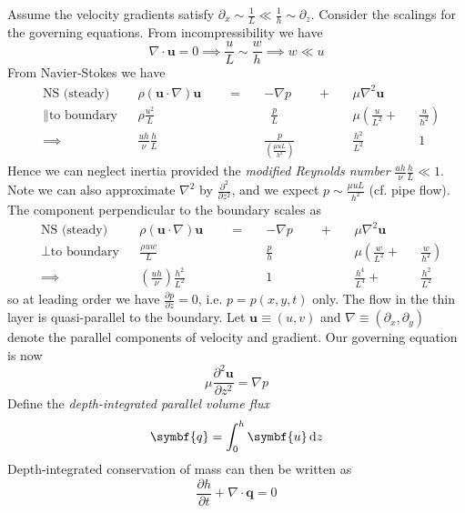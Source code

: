 \documentclass{jknotes}
\begin{document}
Assume the velocity gradients satisfy $\partial_x \sim \frac{1}{L} \ll
\frac{1}{h} \sim \partial_z$. Consider the scalings for the governing
equations. From incompressibility we have
\begin{equation}
	\nabla \cdot \symbf{u} = 0 \implies \frac{u}{L} \sim \frac{w}{h} \implies
	w \ll u
\end{equation}
From Navier-Stokes we have
\begin{align}
	&\text{NS (steady)} && \rho (\symbf{u}\cdot\nabla)\symbf{u}\hspace{2em} =
	&&-\nabla p
	\hspace{2em}+ &&\mu \nabla^2 \symbf{u} &&\\
	  &\parallel \text{to boundary} &&\rho \frac{u^2}{L} &&\,\,\, \frac{p}{L} && \mu
	\left(\frac{u}{L^2}\right. + &&\left.\frac{u}{h^2}\right)\\
	&\implies &&\frac{u h}{\nu} \frac{h}{L} && \frac{p}{\left(\frac{\mu uL}{h^2}\right)}
	&&\frac{h^2}{L^2} && 1
\end{align}
Hence we can neglect inertia provided the \emph{modified Reynolds number}
$\frac{u h}{\nu} \frac{h}{L} \ll 1$. Note we can also approximate $\nabla^2$
by $\frac{\partial^2}{\partial z^2}$, and we expect $p \sim \frac{\mu u
L}{h^2}$ (cf. pipe flow). The component perpendicular to the boundary scales
as
\begin{align}
	&\text{NS (steady)} && \rho (\symbf{u}\cdot\nabla)\symbf{u}\hspace{2em} =
	&&-\nabla p
	\hspace{2em}+ &&\mu \nabla^2 \symbf{u} &&\\
		&\perp \text{to boundary} && \frac{\rho u w}{L} && \frac{p}{h} && \mu\left( \frac{w}{L^2}\right. +
								&&\left.  \frac{w}{h^2}\right)\\
					   &\implies && \left( \frac{u h}{\nu}\right)
	\frac{h^2}{L^2} && 1 && \frac{h^4}{L^4} +&&\frac{h^2}{L^2}
\end{align}
so at leading order we have $\frac{\partial p}{\partial z} = 0$, i.e. $p =
p(x,y,t)$ only. The flow in the thin layer is quasi-parallel to the boundary.
Let $\symbf{u} \equiv (u,v)$ and $\nabla \equiv (\partial_x, \partial_y)$
denote the parallel components of velocity and gradient. Our governing
equation is now
\begin{equation}
	\mu \frac{\partial^2 \symbf{u}}{\partial z^2} = \nabla p
\end{equation}
Define the \emph{depth-integrated parallel volume flux}
\begin{equation}
	\symbf{q} = \int_0^h \symbf{u} \, \diffd z
\end{equation}
Depth-integrated conservation of mass can then be written as
\begin{equation}
	\frac{\partial h}{\partial t} + \nabla \cdot \symbf{q} = 0
\end{equation}
\end{document}
